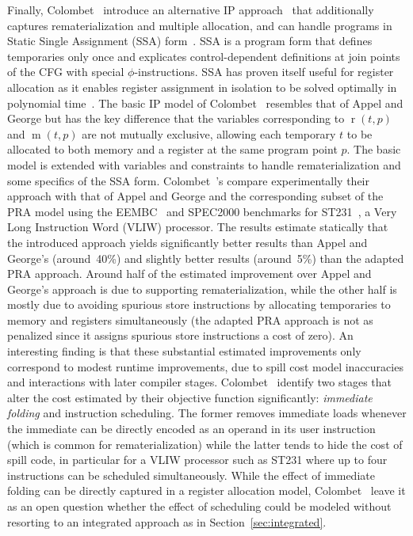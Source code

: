 \documentclass[acmsmall,authorversion,nonacm]{acmart}
\newcommand{\noMathVar}[2]{\operatorname{#1}(#2)}
\newcommand{\var}[2]{$\noMathVar{#1}{#2}$}
\begin{document}
Finally, Colombet~\etal{} introduce an alternative IP
approach~\cite{Colombet2015} that additionally captures
rematerialization and multiple allocation, and can handle programs in
Static Single Assignment (SSA) form~\cite{Cytron1991}.
SSA is a program form that defines temporaries only once and
explicates control-dependent definitions at join points of the CFG
with special $\phi$-instructions.
SSA has proven itself useful for register allocation as it enables
register assignment in isolation to be solved optimally in polynomial
time~\cite{Hack2006}.
The basic IP model of Colombet~\etal{} resembles that of Appel and
George but has the key difference that the variables corresponding to
\var{r}{t,p} and \var{m}{t,p} are not mutually exclusive, allowing
each temporary $t$ to be allocated to both memory and a register at
the same program point $p$.
The basic model is extended with variables and constraints to handle
rematerialization and some specifics of the SSA form.
Colombet~\etal{}'s compare experimentally their approach with that of
Appel and George and the corresponding subset of the PRA model using
the EEMBC~\cite{Poovey2009} and SPEC2000 benchmarks for
ST231~\cite{Faraboschi2000}, a Very Long Instruction Word (VLIW)
processor.
The results estimate statically that the introduced approach yields
significantly better results than Appel and George's (around~40\%) and
slightly better results (around~5\%) than the adapted PRA approach.
Around half of the estimated improvement over Appel and George's
approach is due to supporting rematerialization, while the other half
is mostly due to avoiding spurious store instructions by allocating
temporaries to memory and registers simultaneously (the adapted PRA
approach is not as penalized since it assigns spurious store
instructions a cost of zero).
An interesting finding is that these substantial estimated
improvements only correspond to modest runtime improvements, due to
spill cost model inaccuracies and interactions with later compiler
stages.
Colombet~\etal{} identify two stages that alter the cost estimated by
their objective function significantly: \emph{immediate folding} and
instruction scheduling.
The former removes immediate loads whenever the immediate can be
directly encoded as an operand in its user instruction (which is
common for rematerialization) while the latter tends to hide the cost
of spill code, in particular for a VLIW processor such as ST231 where
up to four instructions can be scheduled simultaneously.
While the effect of immediate folding can be directly captured in a
register allocation model, Colombet~\etal{} leave it as an open
question whether the effect of scheduling could be modeled without
resorting to an integrated approach as in
Section~\ref{sec:integrated}.
\end{document}
